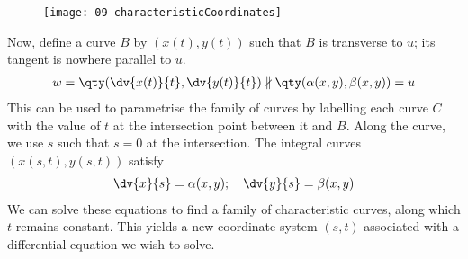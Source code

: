\begin{figure}[h] 
    \centering 
    \texttt{[image: 09-characteristicCoordinates]} 
\end{figure}

Now, define a curve $B$ by $(x(t), y(t))$ such that $B$ is transverse to $u$; its tangent is nowhere parallel to $u$.
\begin{align*}
	w = \qty(\dv{x(t)}{t}, \dv{y(t)}{t}) \nparallel \qty(\alpha(x,y), \beta(x,y)) = u
\end{align*}
This can be used to parametrise the family of curves by labelling each curve $C$ with the value of $t$ at the intersection point between it and $B$.
Along the curve, we use $s$ such that $s = 0$ at the intersection.
The integral curves $(x(s,t), y(s,t))$ satisfy
\begin{align} \label{eq:9.3}
	\dv{x}{s} = \alpha(x,y);\quad \dv{y}{s} = \beta(x,y)
\end{align}
We can solve these equations to find a family of characteristic curves, along which $t$ remains constant.
This yields a new coordinate system $(s,t)$ associated with a differential equation we wish to solve.

